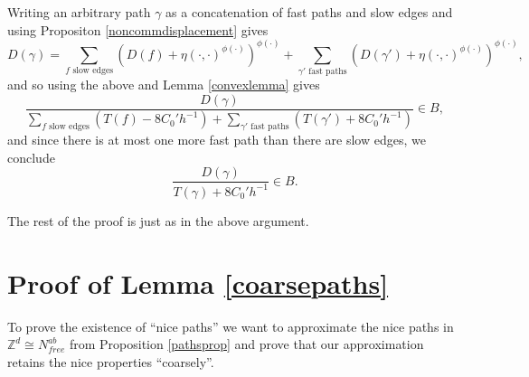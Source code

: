 \documentclass[12pt,reqno]{article}
\numberwithin{equation}{section}
\newcommand{\Z}{\mathbb{Z}}
\begin{document}
Writing an arbitrary path $\gamma$ as a concatenation of fast paths and slow edges and using Propositon \ref{noncommdisplacement} gives
\[
   D(\gamma) = 
   \sum_{f \mbox{ slow edges}} (D(f) + \eta( \cdot, \cdot )^{\phi(\cdot)})^{\phi(\cdot)} 
   + \sum_{\gamma' \mbox{ fast paths}} (D(\gamma') + \eta(\cdot, \cdot)^{\phi(\cdot)})^{\phi(\cdot)},
\]
and so using the above and Lemma \ref{convexlemma} gives
\[
   \frac{D(\gamma)}
   {\sum_{f \mbox{ slow edges}} (T(f) - 8 C_0' h^{-1}) 
   + \sum_{\gamma' \mbox{ fast paths}} (T(\gamma') + 8 C_0' h^{-1})} \in B,
\]
and since there is at most one more fast path than there are slow edges, we conclude
\[ 
   \frac{D(\gamma)}{T(\gamma) + 8 C_0' h^{-1}} \in B.
\]

The rest of the proof is just as in the above argument. 





























\section{Proof of Lemma \ref{coarsepaths}} \label{coarsepathssection}
To prove the existence of ``nice paths'' we want to approximate the nice paths in $\Z^d \cong N^{ab}_{free}$ from Proposition \ref{pathsprop}
and prove that our approximation retains the nice properties ``coarsely''.
\end{document}
